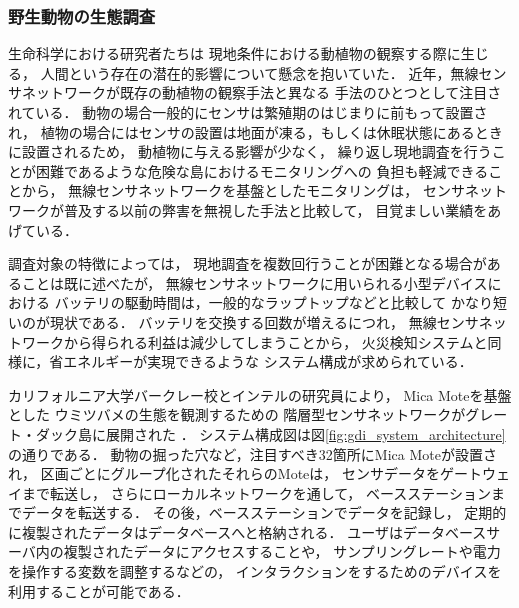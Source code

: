 \subsubsection{野生動物の生態調査}

\vspace{0.5em}生命科学における研究者たちは
現地条件における動植物の観察する際に生じる，
人間という存在の潜在的影響について懸念を抱いていた．
近年，無線センサネットワークが既存の動植物の観察手法と異なる
手法のひとつとして注目されている．
動物の場合一般的にセンサは繁殖期のはじまりに前もって設置され，
植物の場合にはセンサの設置は地面が凍る，もしくは休眠状態にあるときに設置されるため，
動植物に与える影響が少なく，
繰り返し現地調査を行うことが困難であるような危険な島におけるモニタリングへの
負担も軽減できることから，
無線センサネットワークを基盤としたモニタリングは，
センサネットワークが普及する以前の弊害を無視した手法と比較して，
目覚ましい業績をあげている．

調査対象の特徴によっては，
現地調査を複数回行うことが困難となる場合があることは既に述べたが，
無線センサネットワークに用いられる小型デバイスにおける
バッテリの駆動時間は，一般的なラップトップなどと比較して
かなり短いのが現状である．
バッテリを交換する回数が増えるにつれ，
無線センサネットワークから得られる利益は減少してしまうことから，
火災検知システムと同様に，省エネルギーが実現できるような
システム構成が求められている．


カリフォルニア大学バークレー校とインテルの研究員により，
Mica Moteを基盤とした
ウミツバメの生態を観測するための
階層型センサネットワークがグレート・ダック島に展開された
\cite{Mainwaring:2002:WSN:570738.570751}．
システム構成図は図\ref{fig:gdi_system_architecture}の通りである．
動物の掘った穴など，注目すべき32箇所にMica Moteが設置され，
区画ごとにグループ化されたそれらのMoteは，
センサデータをゲートウェイまで転送し，
さらにローカルネットワークを通して，
ベースステーションまでデータを転送する．
その後，ベースステーションでデータを記録し，
定期的に複製されたデータはデータベースへと格納される．
ユーザはデータベースサーバ内の複製されたデータにアクセスすることや，
サンプリングレートや電力を操作する変数を調整するなどの，
インタラクションをするためのデバイスを利用することが可能である．

